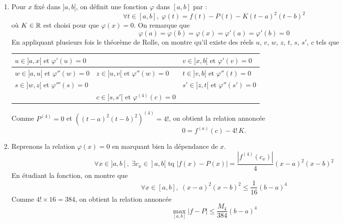 \begin{enumerate}
\begin{enumerate}
  \item Pour $x$ fixé dans $]a,b[$, on définit une fonction $\varphi$ dans $[a,b]$ par :
\begin{displaymath}
  \forall t\in [a,b], \; \varphi(t) = f(t) - P(t) - K(t-a)^2(t-b)^2
\end{displaymath}
où $K\in \mathbb{R}$ est choisi pour que $\varphi(x) = 0$.\newline
On remarque que 
\begin{displaymath}
  \varphi(a)=\varphi(b)=\varphi(x)=\varphi'(a)=\varphi'(b)=0
\end{displaymath}
En appliquant plusieurs fois le théorème de Rolle, on montre qu'il existe des réels $u$, $v$, $w$, $z$, $t$, $s$, $s'$, $c$ tels que 
\begin{center}
\renewcommand{\arraystretch}{1.5}
\begin{tabular}{lll}
$u\in ]a,x[ \text{ et } \varphi'(u)=0$ &  & $v\in ]x,b[ \text{ et } \varphi'(v)=0$\\ \hline
$w\in ]a,u[ \text{ et } \varphi''(w)=0$ & $z\in ]u,v[ \text{ et } \varphi''(w)=0$ & $t\in ]v,b[ \text{ et } \varphi''(t)=0$\\ \hline
$s\in ]w,z[ \text{ et } \varphi'''(s)=0$ &  & $s'\in ]z,t[ \text{ et } \varphi''(s')=0$\\ \hline
 & $c\in ]s,s'[ \text{ et } \varphi^{(4)}(c) = 0$ & 
\end{tabular}
\end{center}
Comme $P^{(4)}=0$ et $\left( (t-a)^2(t-b)^2\right)^{(4)}= 4!$, on obtient la relation annoncée
\begin{displaymath}
  0 = f^{(a)}(c) - 4!\,K.
\end{displaymath}

  \item Reprenons la relation $\varphi(x)=0$ en marquant bien la dépendance de $x$.
\begin{displaymath}
\forall x \in ]a,b[,\; \exists c_x \in ]a,b[ \text{ tq }
\left|f(x) - P(x) \right| = \frac{\left|f^{(4)}(c_x)\right|}{4}(x-a)^2(x-b)^2
\end{displaymath}
En étudiant la fonction, on montre que 
\begin{displaymath}
  \forall x \in [a,b], \; (x-a)^2(x-b)^2 \leq \frac{1}{16}(b-a)^4
\end{displaymath}
Comme $4! \times 16 = 384$, on obtient la relation annoncée
\begin{displaymath}
  \max_{[a,b]}\left|f -P\right| \leq \frac{M_4}{384}(b-a)^4
\end{displaymath}
\end{enumerate}
\end{enumerate}

